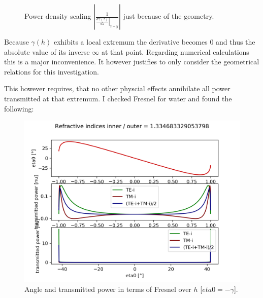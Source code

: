 \documentclass[pagesize=pdftex,paper=a4,fontsize=12pt]{scrartcl}
\newcommand{\abs}[1]{\ensuremath{\left|{#1}\right|}}
\begin{document}
\begin{figure}[H]
	\centering
	\caption{Power density scaling $\abs{\frac{1}{\displaystyle \left.\frac{d\gamma (z)}{dz}\right|_{z=y}}}$ just because of the geometry.}
	\label{fig:invdGammadHOverHExcerpt}
\end{figure}

Because $\gamma (h)$ exhibits a local extremum the derivative becomes $0$ and thus the absolute value of its inverse $\infty$ at that point. Regarding numerical calculations this is a major inconvenience. It however justifies to only consider the geometrical relations for this investigation.

\vspace*{\fill}

This however requires, that no other physcial effects annihilate all power transmitted at that extremum. I checked Fresnel for water and found the following:
\begin{figure}[H]
	\centering
	\includegraphics[trim={0cm 4.12cm 0cm 1cm}, clip, width=12cm]{./Images/results_550.00.png}
	\caption{Angle and transmitted power in terms of Fresnel over $h$ [$eta0 = -\gamma$].}
	\label{fig:waterFresnell}
\end{figure}
\end{document}
